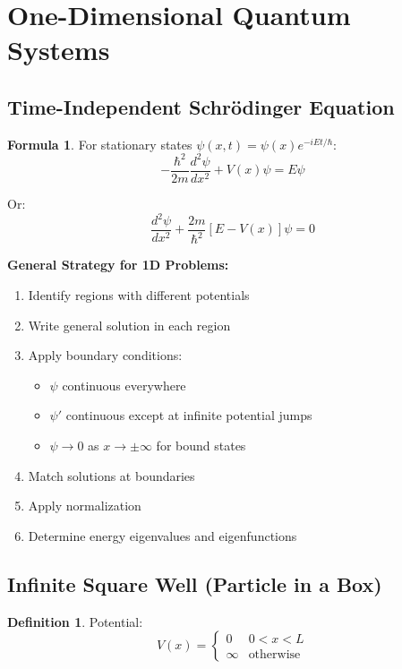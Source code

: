 \documentclass[12pt,a4paper]{article}
\theoremstyle{definition}
\newtheorem{definition}[theorem]{Definition}
\newtheorem{formula}[theorem]{Formula}
\begin{document}
\newpage
\section{One-Dimensional Quantum Systems}

\subsection{Time-Independent Schrödinger Equation}

\begin{formula}
For stationary states $\psi(x,t) = \psi(x)e^{-iEt/\hbar}$:
\[
-\frac{\hbar^2}{2m}\frac{d^2\psi}{dx^2} + V(x)\psi = E\psi
\]

Or:
\[
\frac{d^2\psi}{dx^2} + \frac{2m}{\hbar^2}[E - V(x)]\psi = 0
\]
\end{formula}

\begin{importantbox}
\textbf{General Strategy for 1D Problems:}
\begin{enumerate}
    \item Identify regions with different potentials
    \item Write general solution in each region
    \item Apply boundary conditions:
    \begin{itemize}
        \item $\psi$ continuous everywhere
        \item $\psi'$ continuous except at infinite potential jumps
        \item $\psi \to 0$ as $x \to \pm\infty$ for bound states
    \end{itemize}
    \item Match solutions at boundaries
    \item Apply normalization
    \item Determine energy eigenvalues and eigenfunctions
\end{enumerate}
\end{importantbox}

\subsection{Infinite Square Well (Particle in a Box)}

\begin{definition}
Potential:
\[
V(x) = \begin{cases}
0 & 0 < x < L \\
\infty & \text{otherwise}
\end{cases}
\]
\end{definition}
\end{document}

